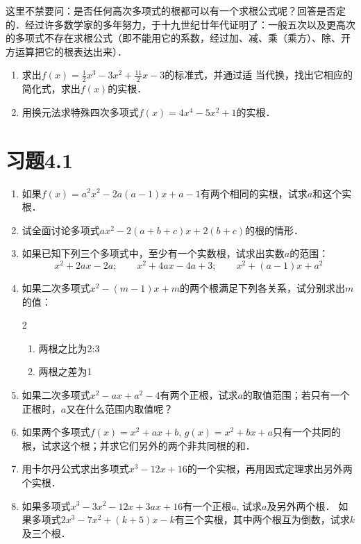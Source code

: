 这里不禁要问：是否任何高次多项式的根都可以有一个求根公式呢？回答是否定的．经过许多数学家的多年努力，于十九世纪廿年代证明了：一般五次以及更高次的多项式不存在求根公式（即不能用它的系数，经过加、减、乘（乘方）、除、开方运算把它的根表达出来）．

\begin{ex}
\begin{enumerate}
    \item 求出$f(x)=\frac{1}{2}x^3-3x^2+\frac{11}{2}x-3$的标准式，并通过适
当代换，找出它相应的简化式，求出$f(x)$的实根．
\item 用换元法求特殊四次多项式$f(x)=4x^4-5x^2+1$的实根．
\end{enumerate}
\end{ex}

\section*{习题4.1}
\begin{enumerate}
    \item 如果$f(x)=a^2x^2-2a(a-1)x+a-1$有两个相同的实根，试求$a$和这个实根．
    \item 试全面讨论多项式$ax^2-2(a+b+c)x+2(b+c)$的根的情形．
    \item 如果已知下列三个多项式中，至少有一个实数根，试求出实数$a$的范围：
\[x^2+2ax-2a;\qquad x^2+4ax-4a+3;\qquad x^2+(a-1)x+a^2\]
\item 如果二次多项式$x^2-(m-1)x+m$的两个根满足下列各关系，试分别求出$m$的值：
\begin{multicols}{2}
    \begin{enumerate}
        \item 两根之比为2:3
        \item 两根之差为1
    \end{enumerate}
\end{multicols}

\item 如果二次多项式$x^2-ax+a^2-4$有两个正根，试求$a$的取值范围；若只有一个正根时，$a$又在什么范围内取值呢？
\item 如果两个多项式$f(x)=x^2+ax+b$, $g(x)=x^2+bx+a$只有一个共同的根，试求这个根；并求它们另外的两个非共同根的和．
\item 用卡尔丹公式求出多项式$x^3-12x+16$的一个实根，再用因式定理求出另外两个实根．
\item 如果多项式$x^3-3x^2-12x+3ax+16$有一个正根$a$, 试求$a$及另外两个根．
\staritem 如果多项式$2x^3-7x^2+(k+5)x-k$有三个实根，其中两个根互为倒数，试求$k$及三个根．
\end{enumerate}

